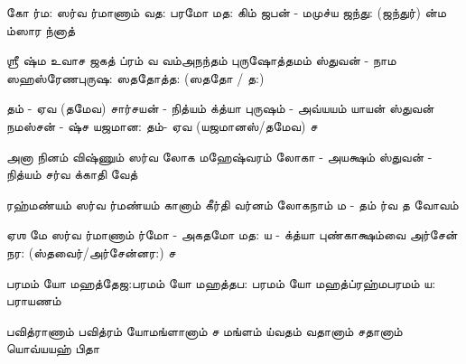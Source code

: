 \documentclass[10pt]{article}
\begin{document}
{%
\slokasl
{கோ ர்ம: ஸர்வ ர்மாணாம்}{ வத: பரமோ மத:}
{கிம் ஜபன் - மமுச்ய ஜந்து: (ஜந்துர்)}{ ன்ம ம்ஸார ந்னாத்}

\slokadl 
{ஶ்ரீ ஷ்ம உவாச}
{ஜகத் ப்ரம் வ வம்}{அநந்தம் புருஷோத்தமம்}
{ஸ்துவன் - நாம ஸஹஸ்ரேண}{புருஷ: ஸததோத்த: (ஸததோ / த:)}

\newpage
\slokasl
{தம் - ஏவ (தமேவ) சார்சயன் - நித்யம்} {க்த்யா புருஷம் - அவ்யயம்}
{யாயன் ஸ்துவன் நமஸ்சன் - ஷ்ச} {யஜமான: தம்- ஏவ (யஜமானஸ்/தமேவ) ச}

\slokasl
{அனா நினம் விஷ்ணும்} {ஸர்வ லோக மஹேஷ்வரம்}
{லோகா - அயக்ஷம் ஸ்துவன் - நித்யம்} {சர்வ க்காதி வேத்}

\slokasl
{ரஹ்மண்யம் ஸர்வ ர்மண்யம்} {கானாம் கீர்தி வர்னம்}
{லோகநாம் ம - தம்} {ர்வ த வோவம்}

\slokasl
{ஏஶ மே ஸர்வ ர்மாணாம்}{ ர்மோ - அகதமோ மத:}
{ய - க்த்யா புண்காக்ஷம்}{வை அர்சேன் நர: (ஸ்தவைர்/அர்சேன்னர:) ச}

\slokasl
{பரமம் யோ மஹத்தேஜ:}{பரமம் யோ மஹத்தப:}
{பரமம் யோ மஹத்ப்ரஹ்ம}{பரமம் ய: பராயணம்}

\slokasl
{பவித்ராணாம் பவித்ரம் யோ}{மங்ளானாம் ச மங்ளம்}
{ய்வதம் வதானாம் ச}{தானாம் யொவ்யயஹ் பிதா}

} 
\end{document}
